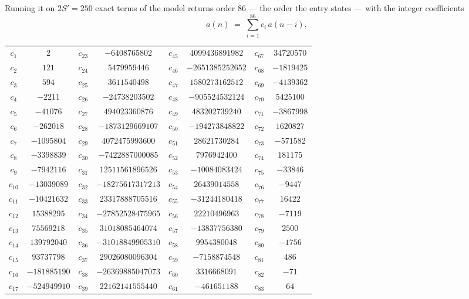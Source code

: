 \documentclass[11pt,a4paper]{article}
\theoremstyle{plain}
\theoremstyle{definition}
\begin{document}
Running it on $2S'=250$ exact terms of the model returns order $86$ --- the order the
entry states --- with the integer coefficients
\[
a(n)\;=\;\sum_{i=1}^{86}c_i\,a(n-i),
\]
\begin{center}\small
\begin{tabular}{cccccccc}
$c_{1}$ & $2$ & $c_{23}$ & $-6408765802$ & $c_{45}$ & $4099436891982$ & $c_{67}$ & $34720570$ \\
$c_{2}$ & $121$ & $c_{24}$ & $5479959446$ & $c_{46}$ & $-2651385252652$ & $c_{68}$ & $-1819425$ \\
$c_{3}$ & $594$ & $c_{25}$ & $3611540498$ & $c_{47}$ & $1580273162512$ & $c_{69}$ & $-4139362$ \\
$c_{4}$ & $-2211$ & $c_{26}$ & $-24738203502$ & $c_{48}$ & $-905524532124$ & $c_{70}$ & $5425100$ \\
$c_{5}$ & $-41076$ & $c_{27}$ & $494023360876$ & $c_{49}$ & $483202739240$ & $c_{71}$ & $-3867998$ \\
$c_{6}$ & $-262018$ & $c_{28}$ & $-1873129669107$ & $c_{50}$ & $-194273848822$ & $c_{72}$ & $1620827$ \\
$c_{7}$ & $-1095804$ & $c_{29}$ & $4072475993600$ & $c_{51}$ & $28621730284$ & $c_{73}$ & $-571582$ \\
$c_{8}$ & $-3398839$ & $c_{30}$ & $-7422887000085$ & $c_{52}$ & $7976942400$ & $c_{74}$ & $181175$ \\
$c_{9}$ & $-7942116$ & $c_{31}$ & $12511561896526$ & $c_{53}$ & $-10084083424$ & $c_{75}$ & $-33846$ \\
$c_{10}$ & $-13039089$ & $c_{32}$ & $-18275617317213$ & $c_{54}$ & $26439014558$ & $c_{76}$ & $-9447$ \\
$c_{11}$ & $-10421632$ & $c_{33}$ & $23317888705516$ & $c_{55}$ & $-31244180418$ & $c_{77}$ & $16422$ \\
$c_{12}$ & $15388295$ & $c_{34}$ & $-27852528475965$ & $c_{56}$ & $22210496963$ & $c_{78}$ & $-7119$ \\
$c_{13}$ & $75569218$ & $c_{35}$ & $31018085464074$ & $c_{57}$ & $-13837756380$ & $c_{79}$ & $2500$ \\
$c_{14}$ & $139792040$ & $c_{36}$ & $-31018849905310$ & $c_{58}$ & $9954380048$ & $c_{80}$ & $-1756$ \\
$c_{15}$ & $93737798$ & $c_{37}$ & $29026080096304$ & $c_{59}$ & $-7158874548$ & $c_{81}$ & $486$ \\
$c_{16}$ & $-181885190$ & $c_{38}$ & $-26369885047073$ & $c_{60}$ & $3316668091$ & $c_{82}$ & $-71$ \\
$c_{17}$ & $-524949910$ & $c_{39}$ & $22162141555440$ & $c_{61}$ & $-461651188$ & $c_{83}$ & $64$ \\

\end{tabular}
\end{center}
\end{document}
